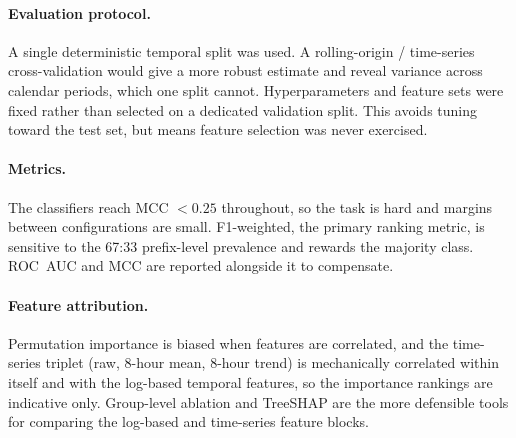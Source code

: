 \documentclass[runningheads]{llncs}
\begin{document}
\paragraph{Evaluation protocol.}
A single deterministic temporal split was used. A rolling-origin / time-series
cross-validation would give a more robust estimate and reveal variance across
calendar periods, which one split cannot. Hyperparameters and feature sets were
fixed rather than selected on a dedicated validation split. This avoids tuning
toward the test set, but means feature selection was never exercised.

\paragraph{Metrics.}
The classifiers reach MCC $< 0.25$ throughout, so the task is hard and margins
between configurations are small. F1-weighted, the primary ranking metric, is
sensitive to the 67:33 prefix-level prevalence and rewards the majority class.
ROC~AUC and MCC are reported alongside it to compensate.

\paragraph{Feature attribution.}
Permutation importance is biased when features are correlated, and the
time-series triplet (raw, 8-hour mean, 8-hour trend) is mechanically correlated
within itself and with the log-based temporal features, so the importance
rankings are indicative only. Group-level ablation and TreeSHAP are the more
defensible tools for comparing the log-based and time-series feature blocks.


\end{document}
